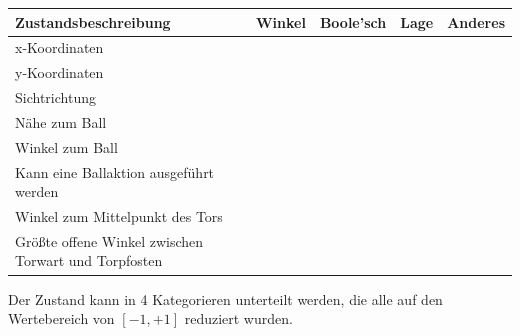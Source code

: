             \begin{table}[H]
                \begin{center}
                \hspace*{-0.75cm}
                \begin{tabular}{ |l|c|c|c|c| } 
                    \hline
                    \hfill Zustandsbeschreibung                          & Winkel & Boole'sch & Lage & Anderes \\ \hline
                    x-Koordinaten                                        & \hfill & \hfill    &      & \cellcolor{black!65}       \\ \hline
                    y-Koordinaten                                        & \hfill & \hfill    &      & \cellcolor{black!65}       \\ \hline
                    Sichtrichtung                                        & \cellcolor{black!65}      & \hfill    &      & \hfill  \\ \hline
                    Nähe zum Ball                                        & \hfill & \hfill    & \cellcolor{black!65}    & \hfill  \\ \hline
                    Winkel zum Ball                                      & \cellcolor{black!65}      & \hfill    &      & \hfill  \\ \hline
                    Kann eine Ballaktion ausgeführt werden               & \hfill & \cellcolor{black!65}         &      & \hfill  \\ \hline
                    Winkel zum Mittelpunkt des Tors                      & \cellcolor{black!65}      & \hfill    &      & \hfill  \\ \hline
                    Größte offene Winkel zwischen Torwart und Torpfosten & \cellcolor{black!65}      & \hfill    &      & \hfill  \\ \hline
                \end{tabular}
                \end{center}
            \end{table}

            \noindent
            Der Zustand kann in 4 Kategorieren unterteilt werden, die alle auf den Wertebereich von $[ -1, +1 ]$ reduziert wurden.

